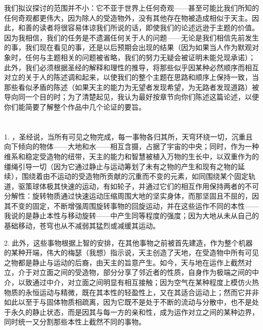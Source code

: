 我们拟议探讨的范围并不小：它不亚于世界上任何奇观——甚至可能比我们所知的任何奇观都更伟大，因为除人的受造物外，没有其他存在物被造成相似于天主。因此，和善的读者将很容易体谅我们所说的话，即使我们的论述远逊于主题的价值。因为我相信，我们的任务是不遗漏任何关于人的问题——无论是我们相信先前发生的事，我们现在看见的事，还是以后预期会出现的结果（因为如果当人作为默观对象时，任何与主题相关的问题被省略，我们的努力无疑会被证明未能兑现承诺）；此外，我们必须根据圣经的解释和理性的推导，将那些似乎因某种必然顺序而相互对立的关于人的陈述调和起来，以使我们的整个主题在思路和顺序上保持一致，当那些看似矛盾的陈述（如果天主的能力为无望者发现希望，为无路者发现道路）被导向同一个目的时；为了清楚起见，我认为最好按章节向你们陈述这篇论述，以便你们能简要了解整个作品中几个论证的要旨。\par


\section{}

1. ，圣经说，当所有可见之物完成，每一事物各归其所，天穹环绕一切，沉重且向下倾向的物体——大地和水——相互含摄，占据了宇宙的中央；同时，作为一种维系和稳定受造物的纽带，天主的能力和智慧被植入万物的生长中，以双重作为的缰绳引导一切（因为它通过静止与运动筹划了未有之物的产生和现有之物的延续），围绕着由不运动的受造物所贡献的沉重而不变的元素，如同围绕某个固定轨道，驱策球体极其快速的运动，有如轮子，并通过它们的相互作用保持两者的不可分解性：旋转物质通过快速运动压缩周围大地的坚实身体，而那坚固且不屈的，因其不变的固定，不断增强周围旋转事物的回旋运动，并在这些运作不同的本性——我说的是静止本性与移动旋转——中产生同等程度的强度；因为大地从未从自己的基础移动，苍穹也从不减弱其猛烈或减缓其运动。\par

2. 此外，这些事物根据上智的安排，在其他事物之前被首先建造，作为整个机器的某种开端，伟大的梅瑟（我想）指示说，天主创造了天地，在受造物中所有可见之物都是静止与运动的后裔，由天主的旨意产生。如今，天与地在运作上截然对立，介于对立面之间的受造物，部分分享了邻近者的性质，自身作为极端之间的中介，以致通过中介，对立面之间明显有相互接触；因为空气在某种程度上模仿火热物质的永恒运动与精微，既在其本性的轻盈性上，又在其适合运动上；然而它并非如此以至于与固体物质相疏离，因为它既不是处于不断的流动与分散中，也不是处于永久的静止状态，而是因其与每一方的亲和性，成为运作对立之间的某种边界，同时统一又分割那些本性上截然不同的事物。\par

